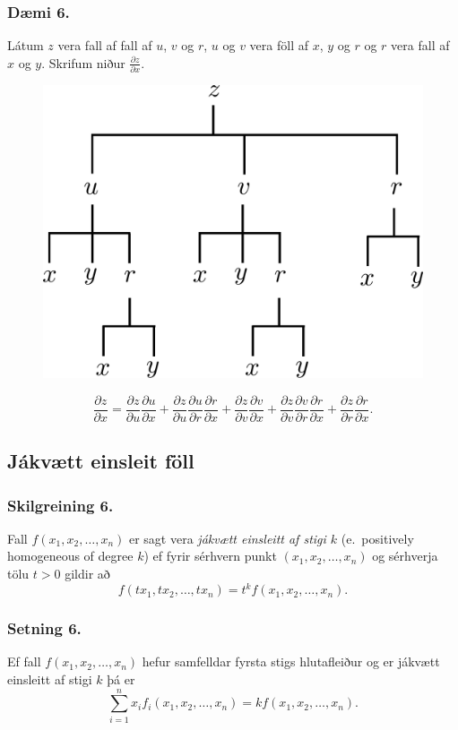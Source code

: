 \subsubsection{Dæmi 6.}
Látum $z$ vera fall af fall af $u$, $v$ og $r$, $u$ og $v$ vera föll af $x$, $y$ og $r$ og $r$ vera fall af $x$ og $y$. Skrifum niður $\frac{\partial z}{\partial x}$.

\begin{figure}[h!]
           \centering
            \includegraphics[width=0.45\linewidth]{chain4}
    \end{figure}
$$\frac{\partial z}{\partial x} = \frac{\partial z}{\partial u} \frac{\partial u}{\partial x} +\frac{\partial z}{\partial u} \frac{\partial u}{\partial r} \frac{\partial r}{\partial x} 
+ \frac{\partial z}{\partial v} \frac{\partial v}{\partial x} + \frac{\partial z}{\partial v} \frac{\partial v}{\partial r} \frac{\partial r}{\partial x} +\frac{\partial z}{\partial r} \frac{\partial r}{\partial x}.$$




\subsection{Jákvætt einsleit föll} 

\subsubsection{Skilgreining 6.}

Fall $f(x_1, x_2, \ldots, x_n)$ er sagt vera {\em jákvætt einsleitt af stigi $k$} (e.~positively homogeneous of degree $k$) ef fyrir sérhvern punkt $(x_1, x_2, \ldots, x_n)$ og sérhverja tölu $t>0$ gildir að 
$$f(tx_1, tx_2, \ldots, tx_n)=t^kf(x_1, x_2, \ldots, x_n).$$


\subsubsection{Setning 6.}
 Ef fall $f(x_1, x_2, \ldots, x_n)$ hefur samfelldar fyrsta stigs hlutafleiður og er jákvætt einsleitt af stigi $k$ þá er 
$$\sum_{i=1}^n x_if_i(x_1, x_2, \ldots, x_n)=kf(x_1, x_2, \ldots, x_n).$$ 
 



